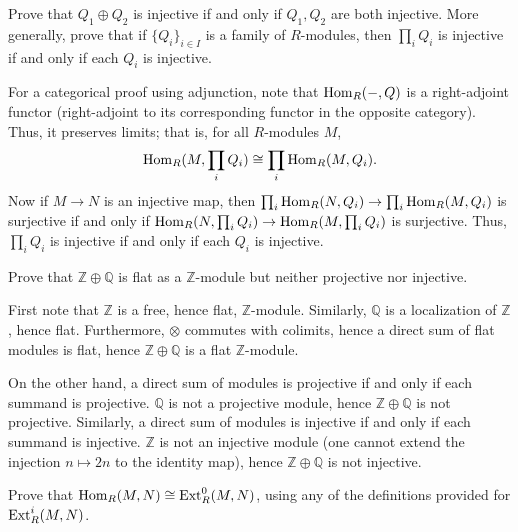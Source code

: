\documentclass[../../master.tex]{subfiles}
\begin{document}
\begin{problem}
    Prove that $Q_1 \oplus Q_2$ is injective if and only if $Q_1, Q_2$ are both injective.
    More generally, prove that if $\{Q_i\}_{i \in I}$ is a family of $R$-modules, then $\prod_i Q_i$ is injective if and only if each $Q_i$ is injective.
\end{problem}

\begin{solution}
    For a categorical proof using adjunction, note that $\operatorname{Hom}_R(-, Q)$ is a right-adjoint functor (right-adjoint to its corresponding functor in the opposite category).
    Thus, it preserves limits;
    that is, for all $R$-modules $M$, 
    \[
    \operatorname{Hom}_R(M, \prod_i Q_i) \cong \prod_i \operatorname{Hom}_R(M, Q_i).
    \]
    Now if $M \to N$ is an injective map, then $\prod_i \operatorname{Hom}_R(N, Q_i) \to \prod_i \operatorname{Hom}_R(M, Q_i)$ is surjective if and only if $\operatorname{Hom}_R(N, \prod_i Q_i) \to \operatorname{Hom}_R(M, \prod_i Q_i)$ is surjective.
    Thus, $\prod_i Q_i$ is injective if and only if each $Q_i$ is injective.
\end{solution}

\begin{problem}
    Prove that $\mathbb{Z} \oplus \mathbb{Q}$ is flat as a $\mathbb{Z}$-module but neither projective nor injective.
\end{problem}

\begin{solution}
    First note that $\mathbb{Z}$ is a free, hence flat, $\mathbb{Z}$-module.
    Similarly, $\mathbb{Q}$ is a localization of $\mathbb{Z}$, hence flat.
    Furthermore, $\otimes$ commutes with colimits, hence a direct sum of flat modules is flat, hence $\mathbb{Z} \oplus \mathbb{Q}$ is a flat $\mathbb{Z}$-module.

    On the other hand, a direct sum of modules is projective if and only if each summand is projective.
    $\mathbb{Q}$ is not a projective module, hence $\mathbb{Z} \oplus \mathbb{Q}$ is not projective.
    Similarly, a direct sum of modules is injective if and only if each summand is injective.
    $\mathbb{Z}$ is not an injective module (one cannot extend the injection $n \mapsto 2n$ to the identity map), hence $\mathbb{Z} \oplus \mathbb{Q}$ is not injective.
\end{solution}

\begin{problem}
    Prove that $\operatorname{Hom}_R(M, N) \cong \operatorname{Ext}_R^{0}(M, N)$, using any of the definitions provided for $\operatorname{Ext}_R^{i}(M, N)$.
\end{problem}
\end{document}
